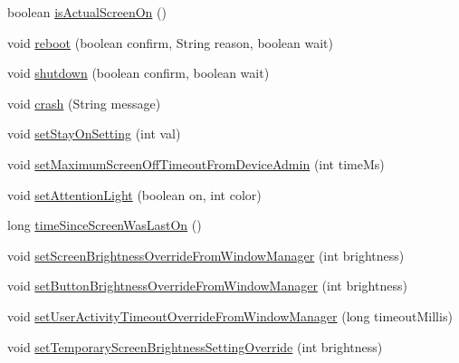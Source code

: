\begin{DoxyCompactItemize}
\item 
boolean \hyperlink{classcom_1_1android_1_1server_1_1power_1_1PowerManagerService_a34fe3f3ab59f1cd9731cfb2eefa4431c}{is\-Actual\-Screen\-On} ()
\item 
void \hyperlink{classcom_1_1android_1_1server_1_1power_1_1PowerManagerService_a95eb0d786da21973541e4792885aa7b5}{reboot} (boolean confirm, String reason, boolean wait)
\item 
void \hyperlink{classcom_1_1android_1_1server_1_1power_1_1PowerManagerService_a1ae14154de05bc246283fa01687e4fc8}{shutdown} (boolean confirm, boolean wait)
\item 
void \hyperlink{classcom_1_1android_1_1server_1_1power_1_1PowerManagerService_a98ff223785ece7b9c30e8ecca67b7867}{crash} (String message)
\item 
void \hyperlink{classcom_1_1android_1_1server_1_1power_1_1PowerManagerService_ab81abded4b2577f62081dcf7d9659630}{set\-Stay\-On\-Setting} (int val)
\item 
void \hyperlink{classcom_1_1android_1_1server_1_1power_1_1PowerManagerService_a25ab9b6fb59613eb589fc4ab30ce21fd}{set\-Maximum\-Screen\-Off\-Timeout\-From\-Device\-Admin} (int time\-Ms)
\item 
void \hyperlink{classcom_1_1android_1_1server_1_1power_1_1PowerManagerService_a71af17d5f1b3caa01229f5a4c23c5e94}{set\-Attention\-Light} (boolean on, int color)
\item 
long \hyperlink{classcom_1_1android_1_1server_1_1power_1_1PowerManagerService_a057c323112fdc09f4b71f1d34e33996c}{time\-Since\-Screen\-Was\-Last\-On} ()
\item 
void \hyperlink{classcom_1_1android_1_1server_1_1power_1_1PowerManagerService_a5633964c7598882ca1c50f469d05f7fa}{set\-Screen\-Brightness\-Override\-From\-Window\-Manager} (int brightness)
\item 
void \hyperlink{classcom_1_1android_1_1server_1_1power_1_1PowerManagerService_a87213a2ce0f6b8a6dc478cd634979299}{set\-Button\-Brightness\-Override\-From\-Window\-Manager} (int brightness)
\item 
void \hyperlink{classcom_1_1android_1_1server_1_1power_1_1PowerManagerService_a14f403354cd8ee18ecc8a4d51263dc69}{set\-User\-Activity\-Timeout\-Override\-From\-Window\-Manager} (long timeout\-Millis)
\item 
void \hyperlink{classcom_1_1android_1_1server_1_1power_1_1PowerManagerService_a24f557fb66d9e937ad23747e6d89fd1d}{set\-Temporary\-Screen\-Brightness\-Setting\-Override} (int brightness)
\item 

\end{DoxyCompactItemize}
